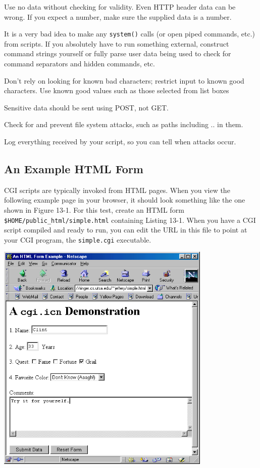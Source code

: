 {\newenvironment{itemize*}%
  {\begin{itemize}%
    \setlength{\itemsep}{0pt}%
    \setlength{\parskip}{0pt}}%
  {\end{itemize}}
\begin{itemize*}
\item Use no data without checking for validity. Even HTTP header data
can be wrong. If you expect a number, make sure the supplied data
is a number.
\item It is a very bad idea to make any \texttt{system()} calls (or open
piped commands, etc.) from scripts. If you absolutely have to run something
external, construct command strings yourself or fully parse user data being
used to check for command separators and hidden commands, etc.
\item Don't rely on looking for known bad characters; restrict input to
known good characters. Use known good values such as those selected from
list boxes
\item Sensitive data should be sent using POST, not GET.
\item Check for and prevent file system attacks, such as
paths including .. in them.
\item Log everything received by your script, so you can
tell when attacks occur.
\end{itemize*}

\subsection{An Example HTML Form}

CGI scripts are typically invoked from HTML pages.
When you view the following example page in your browser,
it should look something like the one shown in Figure 13-1.
For this test, create an HTML form  \texttt{\$HOME/public\_html/simple.html}
containing Listing 13-1. When you have a CGI script compiled and ready to
run, you can edit the URL in this file to point at your CGI program, the
\texttt{simple.cgi} executable.


\begin{center}
\includegraphics[width=4.05in,height=4.36in]{ub-img/ub-img44.png}
\end{center}

}
